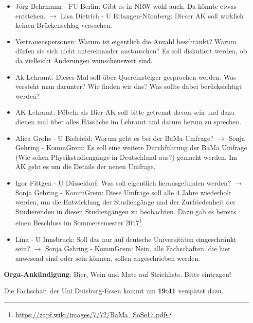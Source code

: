     \begin{itemize}
      \item Jörg Behrmann - FU Berlin:  Gibt es in NRW wohl auch. Da könnte etwas entstehen. $\rightarrow$ Lisa Dietrich - U Erlangen-Nürnberg:  Dieser AK soll wirklich keinen Brückenschlag versuchen.
      \item Vertrauenspersonen: Warum ist eigentlich die Anzahl beschränkt? Warum dürfen sie sich nicht untereinander austauschen? Es soll diskutiert werden, ob da vielleicht Änderungen wünschenswert sind.
      \item Ak Lehramt: Dieses Mal soll über Quereinsteiger gesprochen werden. Was versteht man darunter? Wie finden wir das? Was sollte dabei berücksichtigt werden?
      \item AK Lehramt: Pöbeln als Bier-AK soll bitte getrennt davon sein und dazu dienen mal über alles Hässliche im Lehramt und darum herum zu sprechen.
      \item Alica Grohs - U Bielefeld:  Worum geht es bei der BaMa-Umfrage? $\rightarrow$ Sonja Gehring - KommGrem:  Es soll eine weitere Durchführung der BaMa Umfrage (Wie sehen Physikstudiengänge in Deutschland aus?) gemacht werden. Im AK geht es um die Details der neuen Umfrage.
      \item Igor Fittgen - U Düsseldorf:  Was soll eigentlich herausgefunden werden? $\rightarrow$ Sonja Gehring - KommGrem:  Diese Umfrage soll alle 4 Jahre wiederholt werden, um die Entwicklung der Studiengänge und der Zurfriedenheit der Studierenden in diesen Studiengängen zu beobachten. Dazu gab es bereits einen Beschluss im Sommersemester 2017\footnote{\url{https://zapf.wiki/images/7/72/BaMa_SoSe17.pdf}}.
      \item  Lina - U Innsbruck:  Soll das nur auf deutsche Universitäten eingeschränkt sein? $\rightarrow$ Sonja Gehring - KommGrem:  Nein, alle Fachschaften, die hier anwesend sind oder sein können, sollen angeschrieben werden.
    \end{itemize}

    \begin{info}{}
      \textbf{Orga-Ankündigung}: Bier, Wein und Mate auf Strichliste. Bitte eintragen!
    \end{info}

    \begin{info}{}
      Die Fachschaft der Uni Duisburg-Essen kommt um \textbf{19:41} verspätet dazu.
    \end{info}

